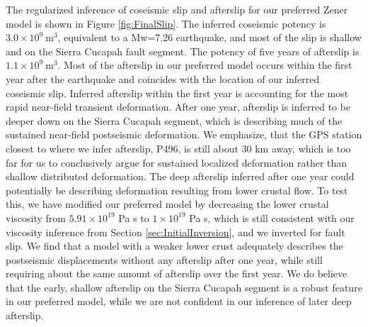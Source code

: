 \documentclass[draft,linenumbers]{AGUJournal}
\begin{document}
The regularized inference of coseismic slip and afterslip for our preferred Zener model is shown in Figure \ref{fig:FinalSlip}.  The inferred coseismic potency is $3.0\times10^{9}\ \mathrm{m}^3$, equivalent to a Mw=7.26 earthquake, and most of the slip is shallow and on the Sierra Cucapah fault segment.  The potency of five years of afterslip is $1.1\times10^{9}\ \mathrm{m}^3$. Most of the afterslip in our preferred model occurs within the first year after the earthquake and coincides with the location of our inferred coseismic slip. Inferred afterslip within the first year is accounting for the most rapid near-field transient deformation. After one year, afterslip is inferred to be deeper down on the Sierra Cucapah segment, which is describing much of the sustained near-field postseismic deformation.  We emphasize, that the GPS station closest to where we infer afterslip, P496, is still about 30 km away, which is too far for us to conclusively argue for sustained localized deformation rather than shallow distributed deformation.  The deep afterslip inferred after one year could potentially be describing deformation resulting from lower crustal flow. To test this, we have modified our preferred model by decreasing the lower crustal viscosity from $5.91\times10^{19}$ Pa s to $1\times10^{19}$ Pa s, which is still consistent with our viscosity inference from Section \ref{sec:InitialInversion}, and we inverted for fault slip.  We find that a model with a weaker lower crust adequately describes the postseismic displacements without any afterslip after one year, while still requiring about the same amount of afterslip over the first year. We do believe that the early, shallow afterslip on the Sierra Cucapah segment is a robust feature in our preferred model, while we are not confident in our inference of later deep afterslip.                   
\end{document}
